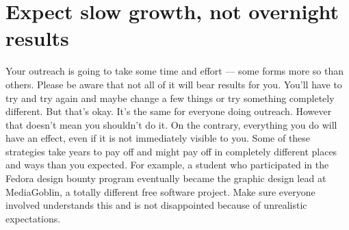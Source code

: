 \section{Expect slow growth, not overnight results}
Your outreach is going to take some time and effort — some forms more so than others. Please be aware that not all of it will bear results for you. You’ll have to try and try again and maybe change a few things or try something completely different. But that’s okay. It’s the same for everyone doing outreach. However that doesn’t mean you shouldn’t do it. On the contrary, everything you do will have an effect, even if it is not immediately visible to you. Some of these strategies take years to pay off and might pay off in completely different places and ways than you expected. For example, a student who participated in the Fedora design bounty program eventually became the graphic design lead at MediaGoblin, a totally different free software project. Make sure everyone involved understands this and is not disappointed because of unrealistic expectations.
